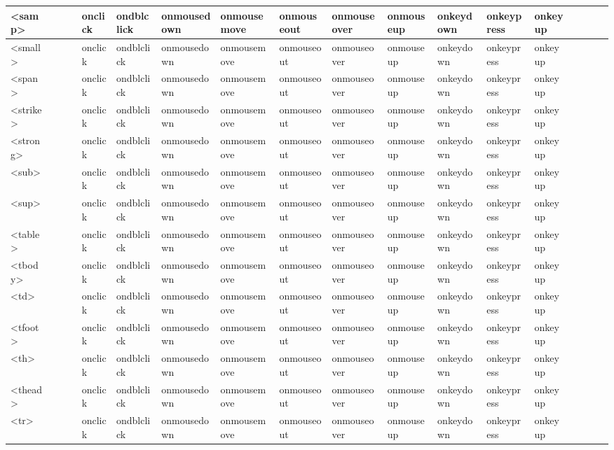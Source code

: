 \begin{center}
\begin{landscape}
\begin{longtable}{|l|l|l|l|l|l|l|l|l|l|l|l|l|l|l|l|l|l|}
\hline
<samp>		&	&	&	& onclick	& ondblclick & onmousedown & onmousemove & onmouseout & onmouseover & onmouseup & onkeydown & onkeypress & onkeyup & & & & \\
\hline
<small>		&	&	&	& onclick	& ondblclick & onmousedown & onmousemove & onmouseout & onmouseover & onmouseup & onkeydown & onkeypress & onkeyup & & & & \\
\hline
<span>		&	&	&	& onclick	& ondblclick & onmousedown & onmousemove & onmouseout & onmouseover & onmouseup & onkeydown & onkeypress & onkeyup & & & & \\
\hline
<strike>		&	&	&	& onclick	& ondblclick & onmousedown & onmousemove & onmouseout & onmouseover & onmouseup & onkeydown & onkeypress & onkeyup & & & & \\
\hline
<strong>		&	&	&	& onclick	& ondblclick & onmousedown & onmousemove & onmouseout & onmouseover & onmouseup & onkeydown & onkeypress & onkeyup & & & & \\
\hline
<sub>		&	&	&	& onclick	& ondblclick & onmousedown & onmousemove & onmouseout & onmouseover & onmouseup & onkeydown & onkeypress & onkeyup & & & & \\
\hline
<sup>		&	&	&	& onclick	& ondblclick & onmousedown & onmousemove & onmouseout & onmouseover & onmouseup & onkeydown & onkeypress & onkeyup & & & & \\
\hline
<table>		&	&	&	& onclick	& ondblclick & onmousedown & onmousemove & onmouseout & onmouseover & onmouseup & onkeydown & onkeypress & onkeyup & & & & \\
\hline
<tbody>		&	&	&	& onclick	& ondblclick & onmousedown & onmousemove & onmouseout & onmouseover & onmouseup & onkeydown & onkeypress & onkeyup & & & & \\
\hline
<td>			&	&	&	& onclick	& ondblclick & onmousedown & onmousemove & onmouseout & onmouseover & onmouseup & onkeydown & onkeypress & onkeyup & & & & \\
\hline
<tfoot>		&	&	&	& onclick	& ondblclick & onmousedown & onmousemove & onmouseout & onmouseover & onmouseup & onkeydown & onkeypress & onkeyup & & & & \\
\hline
<th>			&	&	&	& onclick	& ondblclick & onmousedown & onmousemove & onmouseout & onmouseover & onmouseup & onkeydown & onkeypress & onkeyup & & & & \\
\hline
<thead>		&	&	&	& onclick	& ondblclick & onmousedown & onmousemove & onmouseout & onmouseover & onmouseup & onkeydown & onkeypress & onkeyup & & & & \\
\hline
<tr>			&	&	&	& onclick	& ondblclick & onmousedown & onmousemove & onmouseout & onmouseover & onmouseup & onkeydown & onkeypress & onkeyup & & & & \\

\end{longtable}
\end{landscape}
\end{center}
